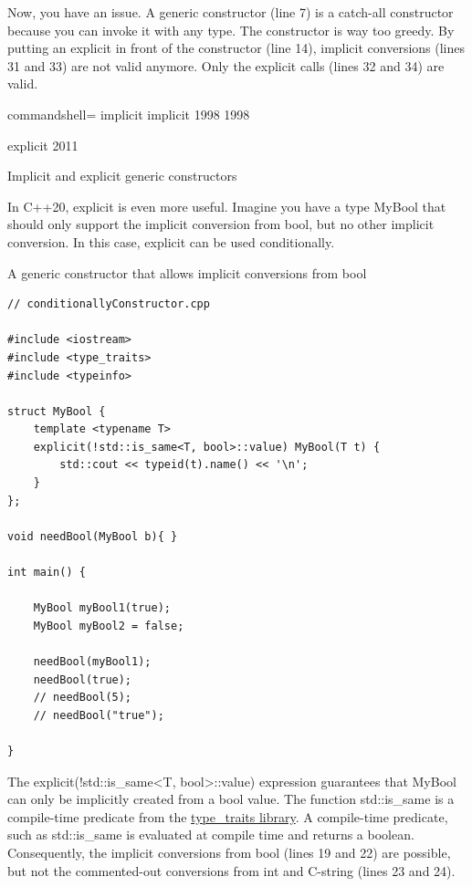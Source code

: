 Now, you have an issue. A generic constructor (line 7) is a catch-all constructor because you can invoke it with any type. The constructor is way too greedy. By putting an explicit in front of the constructor (line 14), implicit conversions (lines 31 and 33) are not valid anymore. Only the explicit calls (lines 32 and 34) are valid.

\begin{tcblisting}{commandshell={}}
implicit
implicit
1998
1998

explicit
2011
\end{tcblisting}

\begin{center}
Implicit and explicit generic constructors
\end{center}

In C++20, explicit is even more useful. Imagine you have a type MyBool that should only support the implicit conversion from bool, but no other implicit conversion. In this case, explicit can be used conditionally.

\noindent
A generic constructor that allows implicit conversions from bool
\begin{lstlisting}[style=styleCXX]
// conditionallyConstructor.cpp

#include <iostream>
#include <type_traits>
#include <typeinfo>

struct MyBool {
	template <typename T>
	explicit(!std::is_same<T, bool>::value) MyBool(T t) {
		std::cout << typeid(t).name() << '\n';
	}
};

void needBool(MyBool b){ }

int main() {

	MyBool myBool1(true);
	MyBool myBool2 = false;
	
	needBool(myBool1);
	needBool(true);
	// needBool(5);
	// needBool("true");

}
\end{lstlisting}

The explicit(!std::is\_same<T, bool>::value) expression guarantees that MyBool can only be implicitly created from a bool value. The function std::is\_same is a compile-time predicate from the \href{https://en.cppreference.com/w/cpp/header/type_traits}{type\_traits library}. A compile-time predicate, such as std::is\_same is evaluated at compile time and returns a boolean. Consequently, the implicit conversions from bool (lines 19 and 22) are possible, but not the commented-out conversions from int and C-string (lines 23 and 24).



